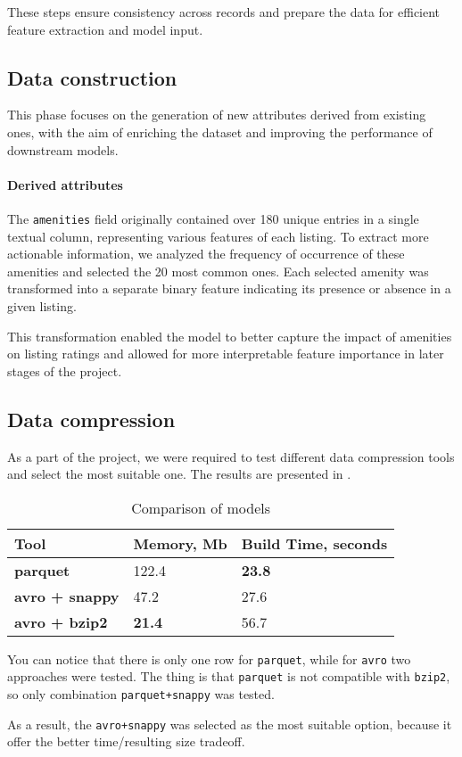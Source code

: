 These steps ensure consistency across records and prepare the data for efficient feature extraction and model input.

\subsection{Data construction}\label{sec:dataConstruction}
This phase focuses on the generation of new attributes derived from existing ones, with the aim of enriching the dataset and improving the performance of downstream models.

\paragraph{Derived attributes}
The \texttt{amenities} field originally contained over 180 unique entries in a single textual column, representing various features of each listing. To extract more actionable information, we analyzed the frequency of occurrence of these amenities and selected the 20 most common ones. Each selected amenity was transformed into a separate binary feature indicating its presence or absence in a given listing.

This transformation enabled the model to better capture the impact of amenities on listing ratings and allowed for more interpretable feature importance in later stages of the project.

\subsection{Data compression}\label{sec:dataCompression}
As a part of the project, we were required to test different data compression tools and select the most suitable one. The results are presented in .

\begin{table}[ht!]
  \small
  \centering
  \caption{Comparison of models}\label{tab:compression_comp}
  \begin{tabular}{lll}
    \toprule
    Tool                   & {Memory, Mb}  & {Build Time, seconds} \\
    \midrule
    \textbf{parquet}       & 122.4         & \textbf{23.8}         \\
    \textbf{avro + snappy} & 47.2          & 27.6                  \\
    \textbf{avro + bzip2}  & \textbf{21.4} & 56.7                  \\
    \bottomrule
  \end{tabular}
\end{table}

You can notice that there is only one row for \texttt{parquet}, while for \texttt{avro} two approaches were tested. The thing is that \texttt{parquet} is not compatible with \texttt{bzip2}, so only combination \texttt{parquet+snappy} was tested.

As a result, the \texttt{avro+snappy} was selected as the most suitable option, because it offer the better time/resulting size tradeoff.
